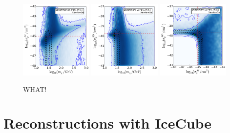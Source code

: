 \begin{figure}[!ht]
  \includegraphics[width=0.32\textwidth]{NT/BenchmarkD_poly_noIC-mx_sigsi.pdf}
  \includegraphics[width=0.32\textwidth]{NT/BenchmarkD_poly_noIC-mx_sigsd.pdf}
  \includegraphics[width=0.32\textwidth]{NT/BenchmarkD_poly_noIC-sigsi_sigsd.pdf}
\caption{WHAT!}
\end{figure}


\section{Reconstructions with IceCube}
\label{sec:NT:withIC}

